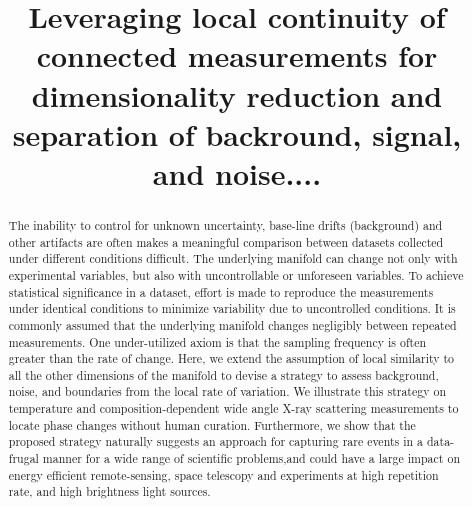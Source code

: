 \documentclass[12pt]{iopart}
\begin{document}
\title[]{Leveraging local continuity of connected measurements for dimensionality reduction and separation of backround, signal, and noise.... }

\author{}


\begin{abstract}
The inability to control for unknown uncertainty, base-line drifts (background) and other artifacts are often makes a meaningful comparison between datasets collected under different conditions difficult.  The underlying manifold can change not only with experimental variables, but also with uncontrollable or unforeseen variables.  To achieve statistical significance in a dataset, effort is made to reproduce the measurements under identical conditions to minimize variability due to uncontrolled conditions.  It is commonly assumed that the underlying manifold changes negligibly between repeated measurements.  One under-utilized axiom is that the sampling frequency is often greater than the rate of change.  Here, we extend the assumption of local similarity to all the other dimensions of the manifold to devise a strategy to assess background, noise, and boundaries from the local rate of variation.  We illustrate this strategy on temperature and composition-dependent wide angle X-ray scattering measurements to locate phase changes without human curation.  Furthermore, we show that the proposed strategy naturally suggests an approach for capturing rare events in a data-frugal manner for a wide range of scientific problems,and could have a large impact on energy efficient remote-sensing, space telescopy and experiments at high repetition rate, and high brightness light sources.
\end{abstract}

%
%
%
% 
%
\end{document}
